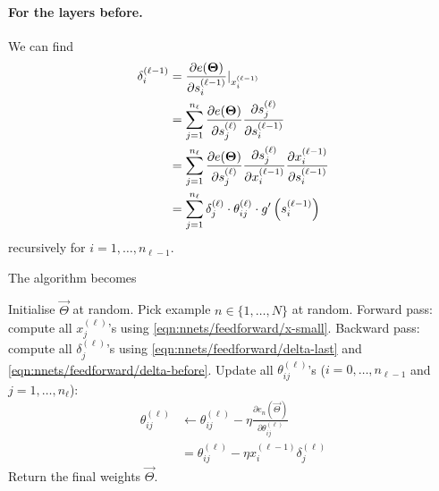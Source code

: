 \paragraph{For the layers before.} We can find
\begin{align}
    \delta_i^{(\ell - 1)}   &= \frac{\partial e(\boldsymbol{\mathbf{\Theta}})}{\partial s_i^{(\ell - 1)}}|_{x_i^{(\ell - 1)}} \\
                            &= \sum_{j = 1}^{n_\ell} \frac{\partial e(\boldsymbol{\mathbf{\Theta}})}{\partial s_j^{(\ell)}} \frac{\partial s_j^{(\ell)}}{\partial s_i^{(\ell - 1)}} \\
                            &= \sum_{j = 1}^{n_\ell} \frac{\partial e(\boldsymbol{\mathbf{\Theta}})}{\partial s_j^{(\ell)}} \frac{\partial s_j^{(\ell)}}{\partial x_i^{(\ell - 1)}} \frac{\partial x_i^{(\ell - 1)}}{\partial s_i^{(\ell - 1)}} \\
                            &= \sum_{j = 1}^{n_\ell} \delta_j^{(\ell)} \cdot \theta_{ij}^{(\ell)} \cdot g'\left(s_i^{(\ell - 1)}\right) \label{eqn:nnets/feedforward/delta-before}
\end{align}
recursively for $i = 1, \dotsc, n_{\ell - 1}$.

The algorithm becomes
\begin{algorithmbis}\label{alg:nnets/feedforward/backprop}
    \begin{algorithmic}[1]
        \State Initialise $\vec \Theta$ at random.
        \Repeat
            \State Pick example $n \in \{1, \dotsc, N\}$ at random.
            \State Forward pass: compute all $x_j^{(\ell)}$'s using \eqref{eqn:nnets/feedforward/x-small}.
            \State Backward pass: compute all $\delta_j^{(\ell)}$'s using \eqref{eqn:nnets/feedforward/delta-last} and \eqref{eqn:nnets/feedforward/delta-before}.
            \State Update all $\theta_{ij}^{(\ell)}$'s ($i = 0, \dotsc, n_{\ell - 1}$ and $j = 1, \dotsc, n_\ell$):
                \begin{align}
                    \theta_{ij}^{(\ell)}    &\leftarrow \theta_{ij}^{(\ell)} - \eta\frac{\partial e_n(\vec \Theta)}{\partial \theta_{ij}^{(\ell)}} \\
                                            &= \theta_{ij}^{(\ell)} - \eta x_i^{(\ell - 1)} \delta_j^{(\ell)}
                \end{align}
        \State Return the final weights $\vec \Theta$.
    \end{algorithmic}
\end{algorithmbis}

